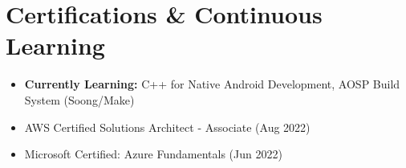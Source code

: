 \documentclass[11pt,a4paper]{article}
\begin{document}
\vspace{6pt}
\section*{Certifications \& Continuous Learning}
\begin{itemize}
\item \textbf{Currently Learning:} C++ for Native Android Development, AOSP Build System (Soong/Make)
\item AWS Certified Solutions Architect - Associate (Aug 2022)
\item Microsoft Certified: Azure Fundamentals (Jun 2022)
\end{itemize}
\end{document}
